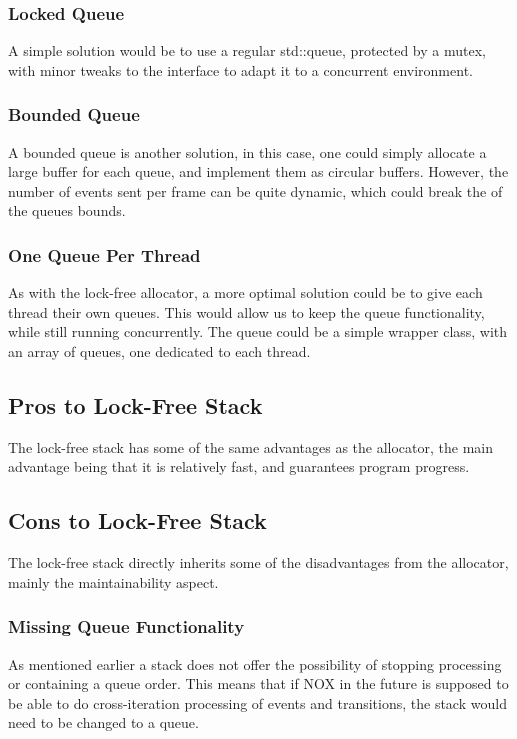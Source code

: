 \subsubsection{Locked Queue}
A simple solution would be to use a regular std::queue, protected by a mutex,
with minor tweaks to the interface to adapt it to a concurrent environment.

\subsubsection{Bounded Queue}
A bounded queue is another solution, in this case, one could simply allocate a large buffer for each queue, and implement them as circular buffers.
However, the number of events sent per frame can be quite dynamic, which could break the of the queues bounds.

\subsubsection{One Queue Per Thread}
As with the lock-free allocator, a more optimal solution could be to give each thread
their own queues.
This would allow us to keep the queue functionality, while still running concurrently.
The queue could be a simple wrapper class, with an array of queues, one dedicated to each thread.

\subsection{Pros to Lock-Free Stack}
The lock-free stack has some of the same advantages as the allocator,
the main advantage being that it is relatively fast, and guarantees program progress.

\subsection{Cons to Lock-Free Stack}
The lock-free stack directly inherits some of the disadvantages from the allocator,
mainly the maintainability aspect.

\subsubsection{Missing Queue Functionality}
As mentioned earlier a stack does not offer the possibility of stopping processing or containing a queue order.
This means that if NOX in the future is supposed to be able to do cross-iteration processing of events and transitions, the stack would need to be changed to a queue.

